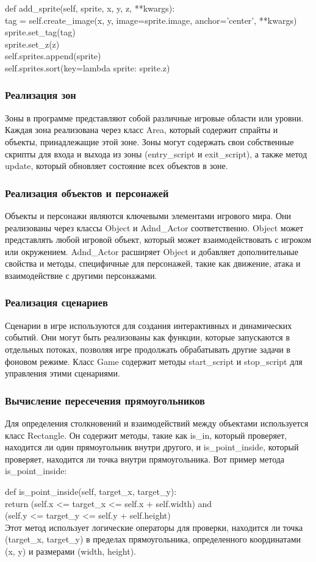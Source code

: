 def add\_sprite(self, sprite, x, y, z, **kwargs):\\
tag = self.create\_image(x, y, image=sprite.image, anchor='center', **kwargs)\\
sprite.set\_tag(tag)\\
sprite.set\_z(z)\\
self.sprites.append(sprite)\\
self.sprites.sort(key=lambda sprite: sprite.z)
\subsubsection{Реализация зон}
Зоны в программе представляют собой различные игровые области или уровни. Каждая зона реализована через класс Area, который содержит спрайты и объекты, принадлежащие этой зоне. Зоны могут содержать свои собственные скрипты для входа и выхода из зоны (entry\_script и exit\_script), а также метод update, который обновляет состояние всех объектов в зоне.
\subsubsection{Реализация объектов и персонажей}
Объекты и персонажи являются ключевыми элементами игрового мира. Они реализованы через классы Object и Adnd\_Actor соответственно. Object может представлять любой игровой объект, который может взаимодействовать с игроком или окружением. Adnd\_Actor расширяет Object и добавляет дополнительные свойства и методы, специфичные для персонажей, такие как движение, атака и взаимодействие с другими персонажами.
\subsubsection{Реализация сценариев}
Сценарии в игре используются для создания интерактивных и динамических событий. Они могут быть реализованы как функции, которые запускаются в отдельных потоках, позволяя игре продолжать обрабатывать другие задачи в фоновом режиме. Класс Game содержит методы start\_script и stop\_script для управления этими сценариями.
\subsubsection{Вычисление пересечения прямоугольников}
Для определения столкновений и взаимодействий между объектами используется класс Rectangle. Он содержит методы, такие как is\_in, который проверяет, находится ли один прямоугольник внутри другого, и is\_point\_inside, который проверяет, находится ли точка внутри прямоугольника. Вот пример метода is\_point\_inside:

def is\_point\_inside(self, target\_x, target\_y):\\
return (self.x <= target\_x <= self.x + self.width) and \\
(self.y <= target\_y <= self.y + self.height) \\
Этот метод использует логические операторы для проверки, находится ли точка (target\_x, target\_y) в пределах прямоугольника, определенного координатами (x, y) и размерами (width, height).

